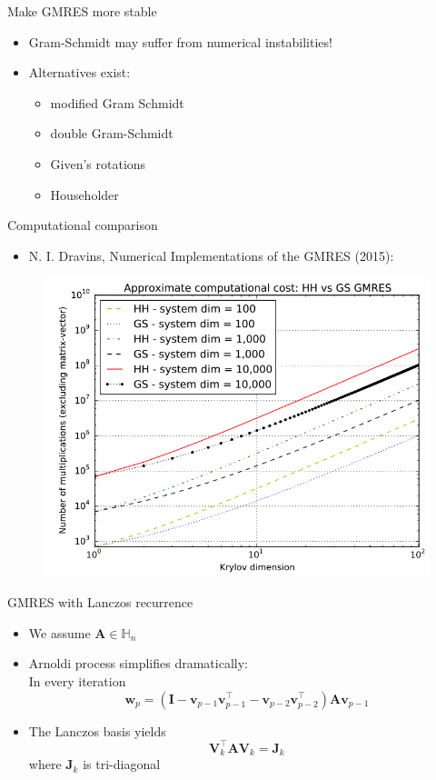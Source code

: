 \documentclass{beamer}
\newcommand{\bvec}[1]{\mathbf{#1}}
\newcommand{\vv}{\bvec{v}}
\newcommand{\vw}{\bvec{w}}
\newcommand{\vA}{\bvec{A}}
\newcommand{\vI}{\bvec{I}}
\newcommand{\vJ}{\bvec{J}}
\newcommand{\vV}{\bvec{V}}
\newcommand{\bitem}{\item[$\bullet$]}
\begin{document}
\begin{frame}{Make GMRES more stable}

\begin{itemize}
    \bitem Gram-Schmidt may suffer from numerical instabilities!
    \bitem Alternatives exist:
    \begin{itemize}
        \item[] modified Gram Schmidt
        \item[] double Gram-Schmidt
        \item[] Given's rotations
        \item[] Householder
    \end{itemize}
\end{itemize}
    
\end{frame}

\begin{frame}{Computational comparison}


\begin{itemize}
    \bitem N. I. Dravins, Numerical Implementations of the GMRES (2015):
\end{itemize}

\begin{figure}
    \centering
    \includegraphics[width = .5\textwidth]{Graphics/HHvsGS_GMRES.png}
\end{figure}
\end{frame}

\begin{frame}{GMRES with Lanczos recurrence}

\begin{itemize}
    \bitem We assume $\vA \in\mathbb{H}_n$
    \bitem Arnoldi process simplifies dramatically:\\
    In every iteration
    $$
    \vw_p = (\vI  - \vv_{p-1}\vv_{p-1}^\top - \vv_{p-2}\vv_{p-2}^\top) \vA \vv_{p-1}
    $$
    \bitem The Lanczos basis yields
    $$
    \vV_k^\top \vA \vV_k = \vJ_k 
    $$
    where $\vJ_k$ is tri-diagonal
\end{itemize}
    
\end{frame}
\end{document}
